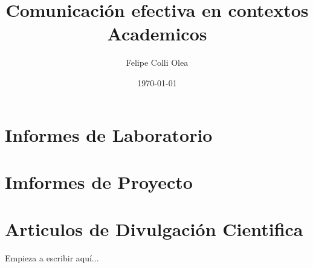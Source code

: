 \documentclass[11pt]{article}
\title{Comunicación efectiva en contextos Academicos}
\author{Felipe Colli Olea}
\date{\today}
\begin{document}
\maketitle
\thispagestyle{fancy}
\tableofcontents

\newpage

\section{Informes de Laboratorio}



\newpage
\section{Imformes de Proyecto}


\newpage
\section{Articulos de Divulgación Cientifica}

Empieza a escribir aquí...
\end{document}
